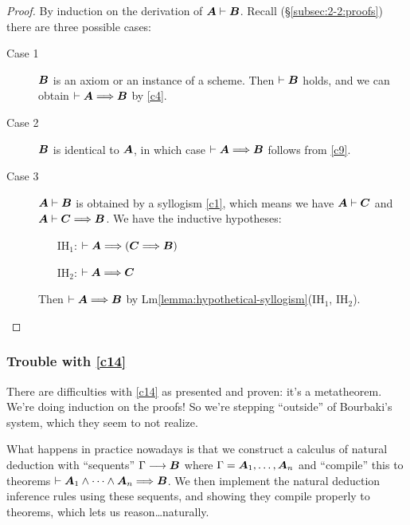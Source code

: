 \begin{proof}
By induction on the derivation of $\boldsymbol{A}\vdash\boldsymbol{B}$.
Recall (\S\ref{subsec:2-2:proofs}) there are three possible cases:
\begin{description}
\item[Case 1] $\boldsymbol{B}$ is an axiom or an instance of a
  scheme. Then $\vdash\boldsymbol{B}$ holds, and we can obtain
  $\vdash\boldsymbol{A}\Longrightarrow\boldsymbol{B}$ by \ref{c4}.
\item[Case 2] $\boldsymbol{B}$ is identical to $\boldsymbol{A}$, in
  which case $\vdash\boldsymbol{A}\Longrightarrow\boldsymbol{B}$ follows
  from \ref{c9}.
\item[Case 3] $\boldsymbol{A}\vdash\boldsymbol{B}$ is obtained by a
  syllogism \ref{c1}, which means we have
  $\boldsymbol{A}\vdash\boldsymbol{C}$ and
  $\boldsymbol{A}\vdash\boldsymbol{C}\Longrightarrow\boldsymbol{B}$. We
  have the inductive hypotheses:
  \begin{itemize}
  \item[IH${}_{1}$:] $\vdash\boldsymbol{A}\Longrightarrow(\boldsymbol{C}\Longrightarrow\boldsymbol{B})$
  \item[IH${}_{2}$:] $\vdash\boldsymbol{A}\Longrightarrow\boldsymbol{C}$
  \end{itemize}
\noindent Then $\vdash\boldsymbol{A}\Longrightarrow\boldsymbol{B}$ by Lm\ref{lemma:hypothetical-syllogism}(IH${}_{1}$, IH${}_{2}$).\qedhere
\end{description}
\end{proof}

\subsubsection{Trouble with \ref{c14}}
There are difficulties with \ref{c14} as presented and proven: it's a
metatheorem. We're doing induction on the proofs! So we're stepping
``outside'' of Bourbaki's system, which they seem to not realize.

What happens in practice nowadays is that we construct a calculus of natural
deduction with ``sequents'' $\Gamma\longrightarrow\boldsymbol{B}$
where $\Gamma=\boldsymbol{A}_{1},\dots,\boldsymbol{A}_{n}$ and
``compile'' this to theorems
$\vdash\boldsymbol{A}_{1}\land\cdots\land\boldsymbol{A}_{n}\Longrightarrow\boldsymbol{B}$. We
then implement the natural deduction inference rules using these
sequents, and showing they compile properly to theorems, which lets us
reason\dots naturally.

